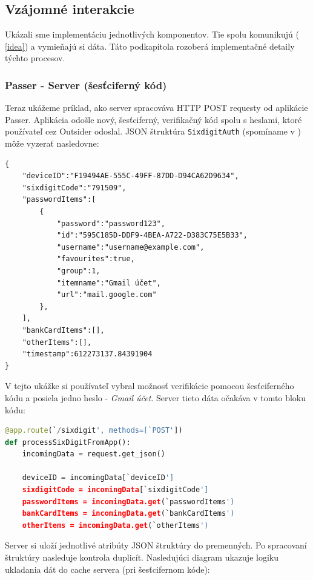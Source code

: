 \subsection{Vzájomné interakcie}
\label{vzajomne_interakcie}
Ukázali sme implementáciu jednotlivých komponentov. Tie spolu komunikujú (\figurename{ \ref{idea}}) a vymieňajú si dáta. Táto podkapitola rozoberá implementačné detaily týchto procesov.  

\subsubsection{Passer - Server (šesťciferný kód)}
Teraz ukážeme príklad, ako server spracováva HTTP POST requesty od aplikácie Passer. Aplikácia odošle nový, šesťciferný, verifikačný kód spolu s heslami, ktoré používateľ cez Outsider odoslal. JSON štruktúra \texttt{SixdigitAuth} (spomíname v ) môže vyzerať nasledovne: 
\newline
{}
\begin{lstlisting}[basicstyle=\small]
{
    "deviceID":"F19494AE-555C-49FF-87DD-D94CA62D9634",
    "sixdigitCode":"791509",
    "passwordItems":[
        {
            "password":"password123",
            "id":"595C185D-DDF9-4BEA-A722-D383C75E5B33",
            "username":"username@example.com",
            "favourites":true,
            "group":1,
            "itemname":"Gmail účet",
            "url":"mail.google.com"
        },
    ],
    "bankCardItems":[],
    "otherItems":[],
    "timestamp":612273137.84391904
}
\end{lstlisting}
\leavevmode\newline
\indent V tejto ukážke si používateľ vybral možnosť verifikácie pomocou šesťciferného kódu a posiela jedno heslo - \textit{Gmail účet}. Server tieto dáta očakáva v tomto bloku kódu:
\newline
\begin{lstlisting}[language=Python, basicstyle=\small]
@app.route(`/sixdigit', methods=[`POST'])
def processSixDigitFromApp():
    incomingData = request.get_json()
    
    deviceID = incomingData[`deviceID']
    sixdigitCode = incomingData[`sixdigitCode']
    passwordItems = incomingData.get(`passwordItems')
    bankCardItems = incomingData.get(`bankCardItems')
    otherItems = incomingData.get(`otherItems')
\end{lstlisting}
\leavevmode\newline
\indent Server si uloží jednotlivé atribúty JSON štruktúry do premenných. Po spracovaní štruktúry nasleduje kontrola duplicít. Nasledujúci diagram ukazuje logiku ukladania dát do cache servera (pri šesťcifernom kóde): 
